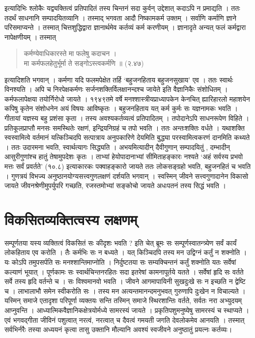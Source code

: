 इत्यादिभिः श्लोकैः यद्व्यक्तित्वं प्रतिपादितं तस्य चिन्तनं सदा कुर्वन् उद्देशात् कदाऽपि न प्रमाद्यति । ततः तदर्थं साधनानि सम्पादयितव्यानि । तस्माद् भगवता आदौ निष्कामकर्म उक्तम् । सर्वाणि कर्माणि ज्ञाने परिसमाप्यन्ते । तस्मात् चित्तशुद्धिद्वारा ज्ञानार्थमेव कर्तव्यं कर्म करणीयम् । ज्ञानादृते अन्यत् फलं कर्मद्वारा नापेक्षणीयम् । तस्मात् 
\begin{verse}
कर्मण्येवाधिकारस्ते मा फलेषु कदाचन । \\
मा कर्मफलहेतुर्भूर्मा ते सङ्गोऽस्त्वकर्मणि ॥ (२.४७)
\end{verse}
इत्यादिशति भगवान् । कर्मणा यदि फलमपेक्षेत तर्हि ‘बहुजनहिताय बहुजनसुखाय' एव । ततः स्वार्थः विनश्यति । अपि च निरपेक्षकर्मणः सर्जनशक्तिर्विलक्षानन्दश्च जायेते इति वैज्ञानिकैः संशोधितम् । कर्मफलापेक्षया तयोर्निरोधो जायते । १९४९तमे वर्षे मनश्शास्त्रीयप्राध्यापकेन केनचित् ह्यारिहारलो महाशयेन कपिषु कृतेन संशोधनेन अयं विषयः आविष्कृतः । बहुजनहिताय यत् कर्म कुर्मः सः यज्ञनामकः भवति । गीतायां यज्ञस्य बहु प्रशंसा कृता । तस्य अवश्यकर्तव्यत्वं प्रतिपादितम् । तपोदानेऽपि साधनरूपेण विहिते । प्रतिकूलप्राप्तौ मनसः समस्थितेः रक्षणं, इन्द्रियनिग्रहं च तपो भवति । ततः अन्तःशक्तिः वर्धते । यथाशक्ति स्वस्वामित्वे वर्तमानं यत्किञ्चिदपि सत्पात्राय अनुपकारिणे देयमिति बुद्ध्या परस्वामित्वकरणं दानमिति कथ्यते । ततः उदारमना भवति, स्वार्थत्यागः सिद्ध्यति । अभयमित्यादीन् दैवीगुणान् सम्पादयितुं , दम्भादीन् आसुरीगुणांश्च हातुं तेषामुपदेशः कृतः । ताभ्यां हेयोपादानाभ्यां सीमिताहङ्कारः नश्यते ‘अहं सर्वस्य प्रभवो मत्तः सर्वं प्रवर्तते' (१०.८) इत्याकारकः पक्वाहङ्कारो जायते ततः लोकसङ्ग्रहो भवति, बहुजनहितं च भवति । गुणत्रयं विभज्य अनुष्ठानयोग्यसत्त्वगुणलक्षणं दर्शयति भगवान् । स्वस्मिन् जीवने सत्त्वगुणादानेन विकासो जायते  जीवनश्रेणीमुपर्युपरि गच्छति, रजस्तमोभ्यां सङ्कोचो जायते अधःपतनं तस्य सिद्धं भवति । 

\section*{विकसितव्यक्तित्वस्य लक्षणम्} 

सम्पूर्णतया यस्य व्यक्तित्वं विकसितं सः कीदृशः भवति ? इति चेत् ब्रूमः सः सम्पूर्णस्वातन्त्र्येण सर्वं कार्यं लोकहिताय एव करोति । तैः कर्मभिः सः न बध्यते । यत् किञ्चिदपि तस्य मन उद्विग्नं कर्तुं न शक्नोति । यः कोऽपि तमुपसर्पति सः मनश्शान्तिमाप्नोति । निर्दुष्टतया सः सम्यक्चिन्तनं कर्तुं शक्नोति यतः सर्वेषां कल्याणं भूयात् । पूर्णकामः सः स्वार्थचिन्तनरहितः सदा इतरेषां कामनापूर्तये यतते । सर्वेषां हृदि सः वर्तते सर्वे तस्य हृदि वर्तन्ते च । सः विश्वमानवो भवति । जीवने आगमापायिनी सुखदुःखे सः न इच्छति न द्वेष्टि च । लाभालाभौ समेन स्वीकरोति सः । तस्य मन अत्यन्तमानन्दमनुभवत् गुरुणापि दुःखेन न विचाल्यते । यस्मिन् समाजे एतादृशा परिपूर्णा व्यक्तयः सन्ति तस्मिन् समाजे स्थिरशान्तिः वर्तते, सर्वतः नरा अभ्युदयम् आप्नुवन्ति । आध्यात्मिकवैज्ञानिकक्षेत्रयोर्मध्ये सामरस्यं जायते । प्रकृतिपशुमनुष्येषु सामरस्यं च स्थाप्यते । एवं भगवद्गीता जीविनं पशुत्वात् नरत्वं, नरत्वात् च दैवत्वं गमयती जगति देवलोकमेव आनयति । तस्मात् सर्वभिर्नरैः तस्या अध्ययनं कृत्वा तासु उक्तानि मौल्यानि अवश्यं स्वजीवने अनुष्ठातुं प्रयत्नः कर्तव्यः। 
